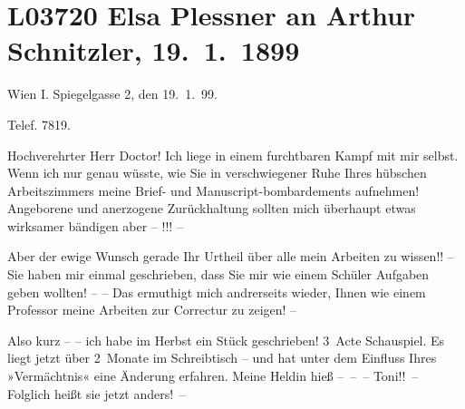 

\section[Elsa Plessner an Arthur Schnitzler, 19. 1. 1899]{L03720 Elsa Plessner an Arthur Schnitzler, 19. 1. 1899}
\nopagebreak{}
\rehead{ }\normalsize\beginnumbering{}
\toendnotes[C]{\smallbreak\pagebreak[2]}
\toendnotes[C]{\smallbreak}
\pstart
           \raggedleft{}{\pb}Wien I. Spiegelgasse 2, den
                     19. 1. 99. \pend
           
\pstart
           \raggedleft{}Telef. 7819.\pend
           
\pstart{}Hochverehrter Herr Doctor!\pend\vspace{0.5em}
\pstart
           Ich liege in einem furchtbaren Kampf mit mir selbst. Wenn ich nur genau wüsste, wie
               Sie in verschwiegener Ruhe Ihres hübschen Arbeitszimmers meine Brief- und
               Manuscript-bombardements aufnehmen! Angeborene und anerzogene Zurückhaltung sollten
               mich überhaupt etwas wirksamer bändigen aber – !!! – \pend
           
\pstart
           Aber der ewige Wunsch gerade Ihr Urtheil über alle mein Arbeiten zu wissen!! – Sie
                  {\pb}haben mir einmal geschrieben, dass Sie mir wie einem Schüler Aufgaben
               geben wollten! – – Das ermuthigt mich andrerseits wieder, Ihnen wie einem Professor
               meine Arbeiten zur Correctur zu zeigen! –\pend
           
\pstart
           Also kurz – – ich habe im Herbst ein Stück geschrieben! 3 Acte Schauspiel. Es liegt jetzt
               über 2 Monate im Schreibtisch – und hat unter dem Einfluss Ihres »Vermächtnis« eine Änderung erfahren. Meine Heldin
               hieß – – – Toni!! – Folglich heißt sie jetzt anders! –\pend
           
